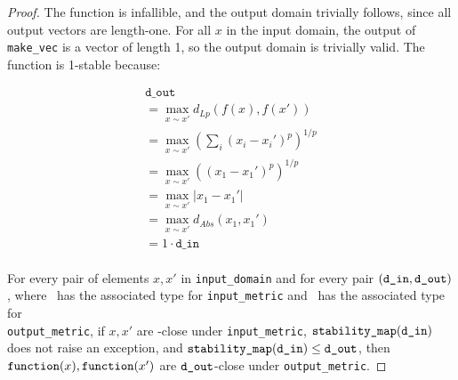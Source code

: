 \documentclass{article}
\begin{document}
\begin{proof}
    The function is infallible, and the output domain trivially follows, since all output vectors are length-one.
    For all $x$ in the input domain, the output of \texttt{make\_vec} is a vector of length 1, so the output domain is trivially valid.
    The function is 1-stable because:

    \begin{align}
        \texttt{d\_out}\\
        = \max_{x \sim x'} d_{Lp}(f(x), f(x'))\\
        = \max_{x \sim x'} (\sum_i (x_i - x_i')^p)^{1/p}\\
        = \max_{x \sim x'} ((x_1 - x_1')^p)^{1/p}\\
        = \max_{x \sim x'} |x_1 - x_1'|\\
        = \max_{x \sim x'} d_{Abs}(x_1, x_1')\\
        = 1 \cdot \texttt{d\_in}\\
    \end{align}

    For every pair of elements $x, x'$ in \texttt{input\_domain} and for every pair $(\texttt{d\_in}, \texttt{d\_out})$, 
    where \din\ has the associated type for \texttt{input\_metric} and \dout\ has the associated type for \\ \texttt{output\_metric}, 
    if $x, x'$ are \din-close under \texttt{input\_metric}, $\texttt{stability\_map}(\texttt{d\_in})$ does not raise an exception,
    and $\texttt{stability\_map}(\texttt{d\_in}) \leq \texttt{d\_out}$, 
    then $\texttt{function}(x), \texttt{function}(x')$ are $\texttt{d\_out}$-close under \texttt{output\_metric}.
\end{proof}
\end{document}
